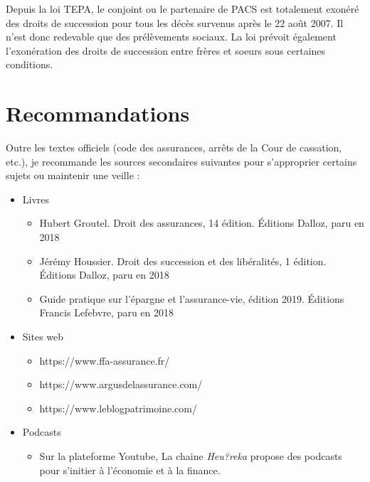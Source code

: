 \documentclass{article}
\newcommand{\blackFrame}[2]{
    \begin{tcolorbox}[colback=white,colframe=black!100!white,title={#1}]
        #2
    \end{tcolorbox}
}
\begin{document}
\blackFrame{Exonération des droits de succession}{
    Depuis la loi TEPA, le conjoint ou le partenaire de PACS est totalement exonéré des droits de succession pour tous les décès survenus après le 22 août 2007. Il n'est donc redevable que des prélèvements sociaux. La loi prévoit également l'exonération des droits de succession entre frères et soeurs sous certaines conditions.
}

\newpage
\section{Recommandations}
Outre les textes officiels (code des assurances, arrêts de la Cour de cassation, etc.), je recommande les sources secondaires suivantes pour s'approprier certains sujets ou maintenir une veille :
\begin{itemize}
    \item Livres
        \begin{itemize}
        \item Hubert Groutel. Droit des assurances, 14 édition. Éditions Dalloz, paru en 2018
        \item Jérémy Houssier. Droit des succession et des libéralités, 1 édition. Éditions Dalloz, paru en 2018
        \item Guide pratique sur l'épargne et l'assurance-vie, édition 2019. Éditions Francis Lefebvre, paru en 2018
    \end{itemize}
    \item Sites web
    \begin{itemize}
        \item https://www.ffa-assurance.fr/
        \item https://www.argusdelassurance.com/
        \item https://www.leblogpatrimoine.com/
    \end{itemize}
    \item Podcasts
    \begin{itemize}
        \item Sur la plateforme Youtube, La chaine \textit{Heu?reka} propose des podcasts pour s'initier à l'économie et à la finance.
    \end{itemize}
\end{itemize}

\end{document}
